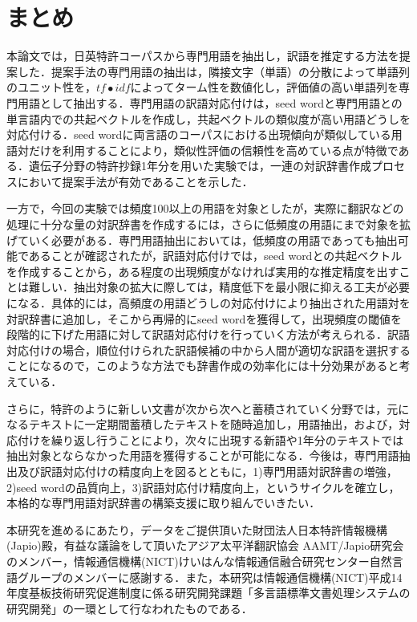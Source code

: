 \documentclass[japanese]{jnlp_1.3e}
\begin{document}
\section{まとめ}

本論文では，日英特許コーパスから専門用語を抽出し，訳語を推定する方法を提案した．提案手法の専門用語の抽出は，隣接文字（単語）の分散によって単語列のユニット性を，$\mathit{tf} \bullet \mathit{idf}$によってターム性を数値化し，評価値の高い単語列を専門用語として抽出する．専門用語の訳語対応付けは，seed wordと専門用語との単言語内での共起ベクトルを作成し，共起ベクトルの類似度が高い用語どうしを対応付ける．seed wordに両言語のコーパスにおける出現傾向が類似している用語対だけを利用することにより，類似性評価の信頼性を高めている点が特徴である．遺伝子分野の特許抄録1年分を用いた実験では，一連の対訳辞書作成プロセスにおいて提案手法が有効であることを示した．

一方で，今回の実験では頻度100以上の用語を対象としたが，実際に翻訳などの処理に十分な量の対訳辞書を作成するには，さらに低頻度の用語にまで対象を拡げていく必要がある．専門用語抽出においては，低頻度の用語であっても抽出可能であることが確認されたが，訳語対応付けでは，seed wordとの共起ベクトルを作成することから，ある程度の出現頻度がなければ実用的な推定精度を出すことは難しい．抽出対象の拡大に際しては，精度低下を最小限に抑える工夫が必要になる．具体的には，高頻度の用語どうしの対応付けにより抽出された用語対を対訳辞書に追加し，そこから再帰的にseed wordを獲得して，出現頻度の閾値を段階的に下げた用語に対して訳語対応付けを行っていく方法が考えられる．訳語対応付けの場合，順位付けられた訳語候補の中から人間が適切な訳語を選択することになるので，このような方法でも辞書作成の効率化には十分効果があると考えている．

さらに，特許のように新しい文書が次から次へと蓄積されていく分野では，元になるテキストに一定期間蓄積したテキストを随時追加し，用語抽出，および，対応付けを繰り返し行うことにより，次々に出現する新語や1年分のテキストでは抽出対象とならなかった用語を獲得することが可能になる．今後は，専門用語抽出及び訳語対応付けの精度向上を図るとともに，1)専門用語対訳辞書の増強，2)seed wordの品質向上，3)訳語対応付け精度向上，というサイクルを確立し，本格的な専門用語対訳辞書の構築支援に取り組んでいきたい．



\acknowledgment
本研究を進めるにあたり，データをご提供頂いた財団法人日本特許情報機構(Japio)殿，有益な議論をして頂いたアジア太平洋翻訳協会 AAMT/Japio研究会のメンバー，情報通信機構(NICT)けいはんな情報通信融合研究センター自然言語グループのメンバーに感謝する．また，本研究は情報通信機構(NICT)平成14年度基板技術研究促進制度に係る研究開発課題「多言語標準文書処理システムの研究開発」の一環として行なわれたものである．
\end{document}
